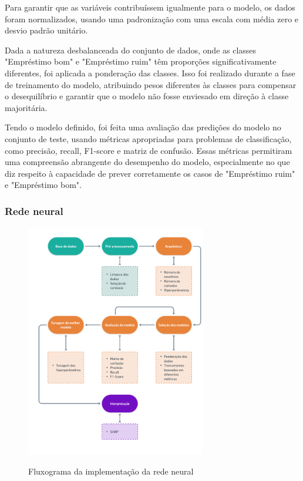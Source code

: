 Para garantir que as variáveis contribuíssem igualmente 
para o modelo, os dados foram normalizados, usando uma padronização com uma escala com média zero e
desvio padrão unitário.

Dada a natureza desbalanceada do conjunto de dados, onde as classes "Empréstimo bom" e "Empréstimo ruim" têm
proporções significativamente diferentes, foi aplicada a ponderação das classes. Isso foi realizado durante 
a fase de treinamento do modelo, atribuindo pesos diferentes às classes para compensar o desequilíbrio e garantir
que o modelo não fosse enviesado em direção à classe majoritária.

Tendo o modelo definido, foi feita uma avaliação das predições do modelo no conjunto de teste, usando métricas
apropriadas para problemas de classificação, como precisão, recall, F1-score e matriz de confusão. 
Essas métricas permitiram uma compreensão abrangente do desempenho do modelo, especialmente no que diz respeito à
capacidade de prever corretamente os casos de "Empréstimo ruim" e "Empréstimo bom".


\subsubsection{Rede neural}

\begin{figure}[H]
  \caption{Fluxograma da implementação da rede neural}
  \centering
  \includegraphics[width=0.7\textwidth]{imagens/flugrama_rede_neural.png}
  \label{fig:imagens/flugrama_rede_neural.png}
\end{figure}



